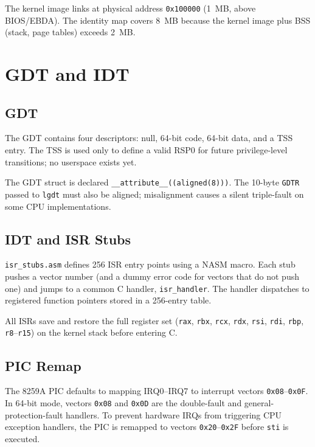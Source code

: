 \documentclass[12pt,a4paper]{article}
\begin{document}
The kernel image links at physical address \texttt{0x100000} (1~MB, above BIOS/EBDA). The identity map covers 8~MB because the kernel image plus BSS (stack, page tables) exceeds 2~MB.

\section{GDT and IDT}

\subsection{GDT}

The GDT contains four descriptors: null, 64-bit code, 64-bit data, and a TSS entry. The TSS is used only to define a valid RSP0 for future privilege-level transitions; no userspace exists yet.

The GDT struct is declared \texttt{\_\_attribute\_\_((aligned(8)))}. The 10-byte \texttt{GDTR} passed to \texttt{lgdt} must also be aligned; misalignment causes a silent triple-fault on some CPU implementations.

\subsection{IDT and ISR Stubs}

\texttt{isr\_stubs.asm} defines 256 ISR entry points using a NASM macro. Each stub pushes a vector number (and a dummy error code for vectors that do not push one) and jumps to a common C handler, \texttt{isr\_handler}. The handler dispatches to registered function pointers stored in a 256-entry table.

All ISRs save and restore the full register set (\texttt{rax}, \texttt{rbx}, \texttt{rcx}, \texttt{rdx}, \texttt{rsi}, \texttt{rdi}, \texttt{rbp}, \texttt{r8}--\texttt{r15}) on the kernel stack before entering C.

\subsection{PIC Remap}

The 8259A PIC defaults to mapping IRQ0--IRQ7 to interrupt vectors \texttt{0x08}--\texttt{0x0F}. In 64-bit mode, vectors \texttt{0x08} and \texttt{0x0D} are the double-fault and general-protection-fault handlers. To prevent hardware IRQs from triggering CPU exception handlers, the PIC is remapped to vectors \texttt{0x20}--\texttt{0x2F} before \texttt{sti} is executed.
\end{document}
